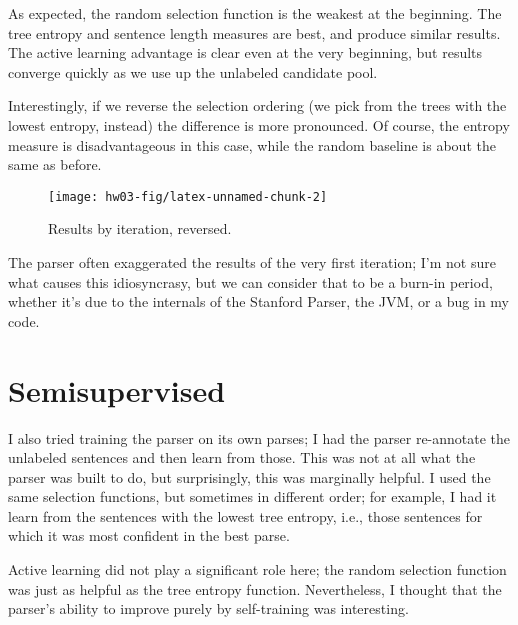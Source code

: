 \documentclass[10pt]{article}\usepackage{graphicx, color}
\newenvironment{knitrout}{}{} %
\begin{document}
As expected, the random selection function is the weakest at the beginning. The tree entropy and sentence length measures are best, and produce similar results. The active learning advantage is clear even at the very beginning, but results converge quickly as we use up the unlabeled candidate pool.

Interestingly, if we reverse the selection ordering (we pick from the trees with the lowest entropy, instead) the difference is more pronounced. Of course, the entropy measure is disadvantageous in this case, while the random baseline is about the same as before.

\begin{figure}[H]
\begin{knitrout}\small
{}\color{fgcolor}

{\centering \texttt{[image: hw03-fig/latex-unnamed-chunk-2]} 

}



\end{knitrout}

  \caption{Results by iteration, reversed.}
  \label{figure:origparse2}
\end{figure}

The parser often exaggerated the results of the very first iteration; I'm not sure what causes this idiosyncrasy, but we can consider that to be a burn-in period, whether it's due to the internals of the Stanford Parser, the JVM, or a bug in my code.


\section{Semisupervised}

I also tried training the parser on its own parses; I had the parser re-annotate the unlabeled sentences and then learn from those. This was not at all what the parser was built to do, but surprisingly, this was marginally helpful.
I used the same selection functions, but sometimes in different order; for example, I had it learn from the sentences with the lowest tree entropy, i.e., those sentences for which it was most confident in the best parse.

Active learning did not play a significant role here; the random selection function was just as helpful as the tree entropy function. Nevertheless, I thought that the parser's ability to improve purely by self-training was interesting.
\end{document}
